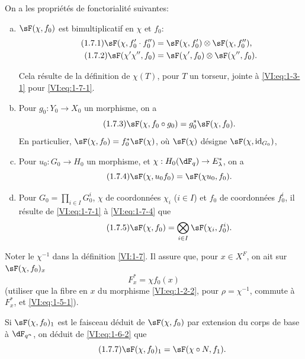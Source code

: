 \documentclass[oneside]{book}
\theoremstyle{sga-source}
\theoremstyle{sga-source-dash}
\theoremstyle{sga-source-dotdash}
\theoremstyle{sga-source-number-note-dash}
\theoremstyle{sga-source-note-number-dotdash}
\theoremstyle{sga-source-example-dotdash}
\theoremstyle{sga-source-inline-number}
\theoremstyle{sga-source-bare-number}
\theoremstyle{sga-source}
\newcommand{\PrintPage}[1]{}\newcommand{\MathPage}[1]{}\newcommand{\PrintCite}[2]{#1}\newcommand{\var}[3]{#2}
\begin{document}
On a les propriétés de fonctorialité suivantes:
\begin{enumerate}[a)]
  \item $\sF(\chi,f_0)$ est bimultiplicatif en $\chi$ et $f_0$: 
    \begin{align*}\tag{1.7.1}\label{VI:eq:1-7-1}
      \sF(\chi,f_0'\cdot f_0'') &= \sF(\chi,f_0')\otimes \sF(\chi,f_0'') \text{,} \\
      \tag{1.7.2}\label{VI:eq:1-7-2}
      \sF(\chi'\chi'',f_0) &= \sF(\chi',f_0)\otimes \sF(\chi'',f_0) \text{.}
    \end{align*}
    \PrintPage{173}
Cela résulte de la définition de $\chi(T)$, pour $T$ un torseur, \var{joint}{jointe}{S45-SOL-0685} 
    à \eqref{VI:eq:1-3-1} pour \eqref{VI:eq:1-7-1}. 
  \item Pour $g_0:Y_0\to X_0$ un morphisme, on a 
    \begin{equation*}\tag{1.7.3}\label{VI:eq:1-7-3}
      \sF(\chi,f_0\circ g_0) = g_0^\ast \sF(\chi,f_0) \text{.}
    \end{equation*}
    En particulier, $\sF(\chi,f_0) = f_0^\ast \sF(\chi)$, où $\sF(\chi)$ 
    désigne $\sF(\chi,\operatorname{id}_{G_0})$, 
  \item Pour $u_0:G_0\to H_0$ un morphisme, et 
    $\chi:H_0(\dF_q) \to E_\lambda^\ast$, on a 
    \begin{equation*}\tag{1.7.4}\label{VI:eq:1-7-4}
      \sF(\chi,u_0 f_0) = \sF(\chi u_0,f_0) \text{.}
    \end{equation*}
  \item Pour $G_0=\prod_{i\in I} G_0^i$, $\chi$ de coordonnées $\chi_i$ 
    ($i\in I$) et $f_0$ de coordonnées $f_0^i$, il résulte de 
    \eqref{VI:eq:1-7-1} à \eqref{VI:eq:1-7-4} que 
    \begin{equation*}\tag{1.7.5}\label{VI:eq:1-7-5}
      \sF(\chi,f_0) = \bigotimes_{i\in I} \sF(\chi_i,f_0^i) \text{.}
    \end{equation*}    
\end{enumerate}

Noter le $\chi^{-1}$ dans la définition \ref{VI:1-7}. Il assure que, pour 
$x\in X^F$, on ait sur $\sF(\chi,f_0)_x$ 
\begin{equation*}\tag{1.7.6}\label{VI:eq:1-7-6}
  F_x^\ast = \chi f_0(x)
\end{equation*}
(utiliser que la fibre en $x$ du morphisme \eqref{VI:eq:1-2-2}, pour 
$\rho=\chi^{-1}$, commute à $F_x^\ast$, et \eqref{VI:eq:1-5-1}). 

Si $\sF(\chi,f_0)_1$ est le faisceau déduit de $\sF(\chi,f_0)$ par extension 
du corps de base à $\dF_{q^n}$, on déduit de \eqref{VI:eq:1-6-2} que 
\begin{equation*}\tag{1.7.7}\label{VI:eq:1-7-7}
  \sF(\chi,f_0)_1 = \sF(\chi\circ N,f_1) \text{.}
\end{equation*}
\end{document}
